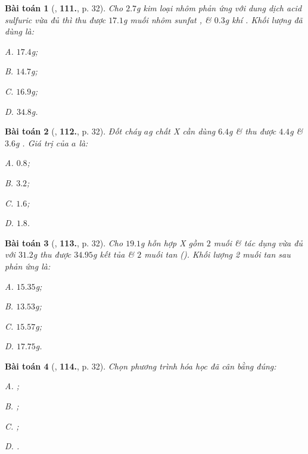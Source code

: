 \documentclass{article}
\numberwithin{equation}{section}
\newtheorem{baitoan}{Bài toán}[section]
\begin{document}
\begin{baitoan}[\cite{An2011}, \textbf{111.}, p. 32]
	Cho $2.7$g kim loại nhôm phản ứng với dung dịch acid sulfuric  vừa đủ thì thu được $17.1$g muối nhôm sunfat , \& $0.3$g khí . Khối lượng  đã dùng là:
	\begin{enumerate*}
		\item[{\rm\sf A.}] $17.4$g;
		\item[{\rm\sf B.}] $14.7$g;
		\item[{\rm\sf C.}] $16.9$g;
		\item[{\rm\sf D.}] $34.8$g.
	\end{enumerate*}
\end{baitoan}

\begin{baitoan}[\cite{An2011}, \textbf{112.}, p. 32]
	Đốt cháy $a$g chất X cần dùng $6.4$g  \& thu được $4.4$g  \& $3.6$g . Giá trị của $a$ là:
	\begin{enumerate*}
		\item[{\rm\sf A.}] $0.8$;
		\item[{\rm\sf B.}] $3.2$;
		\item[{\rm\sf C.}] $1.6$;
		\item[{\rm\sf D.}] $1.8$.
	\end{enumerate*}
\end{baitoan}

\begin{baitoan}[\cite{An2011}, \textbf{113.}, p. 32]
	Cho $19.1$g hỗn hợp X gồm $2$ muối  \&  tác dụng vừa đủ với $31.2$g  thu được $34.95$g kết tủa  \& $2$ muối tan (). Khối lượng 2 muối tan sau phản ứng là:
	\begin{enumerate*}
		\item[{\rm\sf A.}] $15.35$g;
		\item[{\rm\sf B.}] $13.53$g;
		\item[{\rm\sf C.}] $15.57$g;
		\item[{\rm\sf D.}] $17.75$g.
	\end{enumerate*}
\end{baitoan}

\begin{baitoan}[\cite{An2011}, \textbf{114.}, p. 32]
	Chọn phương trình hóa học đã cân bằng đúng:
	\begin{enumerate*}
		\item[{\rm\sf A.}] \emph{};
		\item[{\rm\sf B.}] \emph{};
		\item[{\rm\sf C.}] \emph{};
		\item[{\rm\sf D.}] \emph{}.
	\end{enumerate*}
\end{baitoan}
\end{document}
